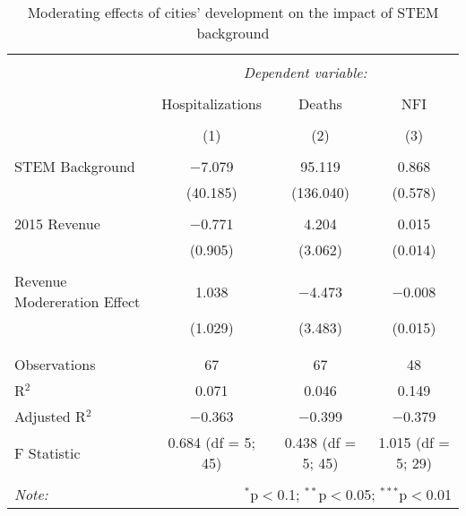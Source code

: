 
\begin{table}[!htbp] \centering 
  \caption{Moderating effects of cities’ development on the impact of STEM background} 
  \label{} 
\begin{tabular}{@{\extracolsep{5pt}}lccc} 
\\[-1.8ex]\hline 
\hline \\[-1.8ex] 
 & \multicolumn{3}{c}{\textit{Dependent variable:}} \\ 
\cline{2-4} 
\\[-1.8ex] & Hospitalizations & Deaths & NFI \\ 
\\[-1.8ex] & (1) & (2) & (3)\\ 
\hline \\[-1.8ex] 
 STEM Background & $-$7.079 & 95.119 & 0.868 \\ 
  & (40.185) & (136.040) & (0.578) \\ 
  & & & \\ 
 2015 Revenue & $-$0.771 & 4.204 & 0.015 \\ 
  & (0.905) & (3.062) & (0.014) \\ 
  & & & \\ 
 Revenue Modereration Effect & 1.038 & $-$4.473 & $-$0.008 \\ 
  & (1.029) & (3.483) & (0.015) \\ 
  & & & \\ 
\hline \\[-1.8ex] 
Observations & 67 & 67 & 48 \\ 
R$^{2}$ & 0.071 & 0.046 & 0.149 \\ 
Adjusted R$^{2}$ & $-$0.363 & $-$0.399 & $-$0.379 \\ 
F Statistic & 0.684 (df = 5; 45) & 0.438 (df = 5; 45) & 1.015 (df = 5; 29) \\ 
\hline 
\hline \\[-1.8ex] 
\textit{Note:}  & \multicolumn{3}{r}{$^{*}$p$<$0.1; $^{**}$p$<$0.05; $^{***}$p$<$0.01} \\ 
\end{tabular} 
\end{table} 
